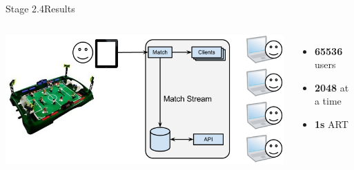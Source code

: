 \documentclass[utf8]{beamer}
\begin{document}
\begin{frame}{Stage 2.4}{Results}
	\begin{columns}
			\includegraphics[top=-1,width=\textwidth]{img/results-3-4.png}
			\begin{itemize}
				\item \textbf{\Large 65536} users
				\item \textbf{\Large 2048} at a time
				\item \textbf{\Large 1s} ART
			\end{itemize}
	\end{columns}
\end{frame}
\end{document}
